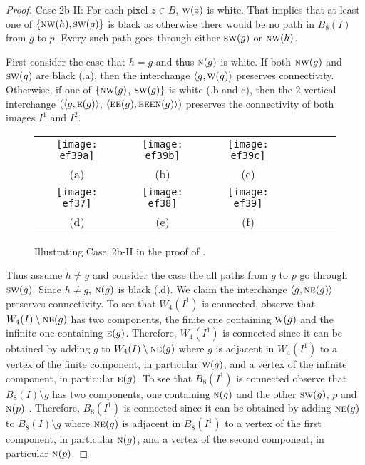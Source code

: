 \documentclass[lotsofwhite,charterfonts]{patmorin}
\newcommand{\N}{\textsc{n}}
\newcommand{\NE}{\textsc{ne}}
\newcommand{\E}{\textsc{e}}
\newcommand{\SW}{\textsc{sw}}
\newcommand{\W}{\textsc{w}}
\newcommand{\NW}{\textsc{nw}}
\newcommand{\ic}[2]{\langle #1,#2 \rangle}
\newcommand{\sm}{\ensuremath{\setminus}}
\begin{document}
\begin{proof}
\noindent Case 2b-II: For each pixel $z\in B$, $\W(z)$ is white. That implies that at least one of $\{\NW(h), \SW(g)\}$ is black as otherwise there would be no path in $B_8(I)$ from $g$ to $p$. Every such path goes through either $\SW(g)$ or $\NW(h)$.

First consider the case that  $h=g$ and thus $\N(g)$ is white. If both $\NW(g)$ and $\SW(g)$ are black (.a), then the interchange $\ic{g}{\W(g)}$ preserves connectivity. Otherwise, if one of $\{\NW(g)$, $\SW(g)\}$ is white (.b and c), then the $2$-vertical interchange $(\ic{g}{\E(g)}$, $\ic{\E\E(g)}{\E\E\E\N(g)})$ preserves the connectivity of both images $I^1$ and $I^2$.

\begin{figure}[htbp]
\begin{center}
\begin{tabular}{ccccccc}
\texttt{[image: ef39a]} &
\texttt{[image: ef39b]} &
\texttt{[image: ef39c]} \\
(a) & (b) & (c)  \\
\texttt{[image: ef37]} &
\texttt{[image: ef38]} &
\texttt{[image: ef39]} \\
(d) & (e) & (f) %
\end{tabular}
\end{center}
\caption{Illustrating Case~2b-II in the proof of .}
\end{figure}


Thus assume $h\not=g$ and consider the case the all paths from  $g$ to $p$ go through $\SW(g)$. Since $h\not=g$, $\N(g)$ is black (.d). We claim the interchange $\ic{g}{\NE(g)}$ preserves connectivity. To see that $W_4(I^1)$ is connected, observe that $W_4(I)\sm \NE(g)$ has two components, the finite one containing $\W(g)$ and the infinite one containing $\E(g)$. Therefore, $W_4(I^1)$ is connected since it can be obtained by adding $g$ to $W_4(I)\sm \NE(g)$ where $g$ is adjacent in $W_4(I^1)$ to a vertex of the finite component, in particular $\W(g)$, and a vertex of the infinite component, in particular $\E(g)$. To see that $B_8(I^1)$ is connected observe that $B_8(I)\sm g$ has two components, one containing $\N(g)$ and the other $\SW(g)$, $p$ and $\N(p)$ . Therefore, $B_8(I^1)$ is connected since it can be obtained by adding $\NE(g)$ to $B_8(I)\sm g$ where $\NE(g)$ is adjacent in $B_8(I^1)$ to a vertex of the first component, in particular $\N(g)$, and a vertex of the second component, in particular $\N(p)$. 


\end{proof}
\end{document}
